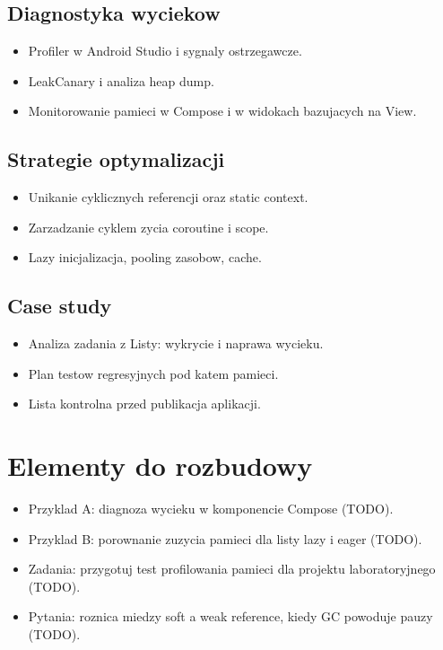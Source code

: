 \subsection{Diagnostyka wyciekow}
\begin{itemize}
  \item Profiler w Android Studio i sygnaly ostrzegawcze.
  \item LeakCanary i analiza heap dump.
  \item Monitorowanie pamieci w Compose i w widokach bazujacych na View.
\end{itemize}

\subsection{Strategie optymalizacji}
\begin{itemize}
  \item Unikanie cyklicznych referencji oraz static context.
  \item Zarzadzanie cyklem zycia coroutine i scope.
  \item Lazy inicjalizacja, pooling zasobow, cache.
\end{itemize}

\subsection{Case study}
\begin{itemize}
  \item Analiza zadania z Listy: wykrycie i naprawa wycieku.
  \item Plan testow regresyjnych pod katem pamieci.
  \item Lista kontrolna przed publikacja aplikacji.
\end{itemize}

\section{Elementy do rozbudowy}
\begin{itemize}
  \item Przyklad A: diagnoza wycieku w komponencie Compose (TODO).
  \item Przyklad B: porownanie zuzycia pamieci dla listy lazy i eager (TODO).
  \item Zadania: przygotuj test profilowania pamieci dla projektu laboratoryjnego (TODO).
  \item Pytania: roznica miedzy soft a weak reference, kiedy GC powoduje pauzy (TODO).
\end{itemize}


